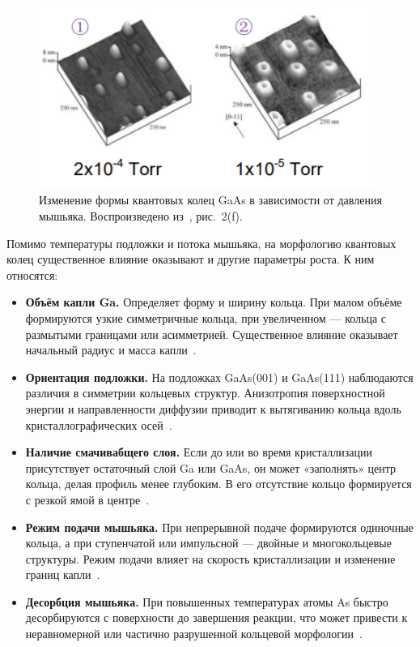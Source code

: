 \documentclass[14pt,oneside]{extarticle}
\begin{document}
\begin{figure}[H]
    \begin{center}
        \includegraphics[width=11cm]{images/fanma_fig2e_right.png}
        \caption{\label{fig:fanma_pressure}
            Изменение формы квантовых колец GaAs в зависимости от давления мышьяка. Воспроизведено из~\cite{fan2023}, рис.~2(f).}
    \end{center}
\end{figure}

Помимо температуры подложки и потока мышьяка, на морфологию квантовых колец существенное влияние оказывают и другие параметры роста. К ним относятся:

\begin{itemize}
    \item \textbf{Объём капли Ga.} Определяет форму и ширину кольца. При малом объёме формируются узкие симметричные кольца, при увеличенном — кольца с размытыми границами или асимметрией. Существенное влияние оказывает начальный радиус и масса капли~\cite{zhou2013}.

    \item \textbf{Ориентация подложки.} На подложках GaAs(001) и GaAs(111) наблюдаются различия в симметрии кольцевых структур. Анизотропия поверхностной энергии и направленности диффузии приводит к вытягиванию кольца вдоль кристаллографических осей~\cite{elborg2017}.

    \item \textbf{Наличие смачивабщего слоя.} Если до или во время кристаллизации присутствует остаточный слой Ga или GaAs, он может «заполнять» центр кольца, делая профиль менее глубоким. В его отсутствие кольцо формируется с резкой ямой в центре~\cite{sibirmovskiy2014}.

    \item \textbf{Режим подачи мышьяка.} При непрерывной подаче формируются одиночные кольца, а при ступенчатой или импульсной — двойные и многокольцевые структуры. Режим подачи влияет на скорость кристаллизации и изменение границ капли~\cite{wang2022}.

    \item \textbf{Десорбция мышьяка.} При повышенных температурах атомы As быстро десорбируются с поверхности до завершения реакции, что может привести к неравномерной или частично разрушенной кольцевой морфологии~\cite{fan2023}.
\end{itemize}
\end{document}
